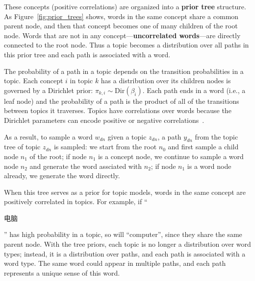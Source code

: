 These concepts (positive correlations) are organized into a {\bf prior
  tree} structure. As Figure~\ref{fig:prior_trees} shows, words in the
same concept share a common parent node, and then that concept becomes
one of many children of the root node.  Words that are not in any
concept---{\bf uncorrelated words}---are directly connected to the
root node. Thus a topic becomes a distribution over all paths in this
prior tree and each path is associated with a word.

The probability of a path in a topic depends on the transition
probabilities in a topic.  Each concept $i$ in topic $k$ has a
distribution over its children nodes is governed by a Dirichlet prior:
$\pi_{k,i} \sim \text{Dir}(\beta_{i})$.  Each path ends in a word
(i.e., a leaf node) and the probability of a path is the product of
all of the transitions between topics it traverses. Topics have
correlations over words because the Dirichlet parameters can encode
positive or negative correlations~\citep{andrzejewski-09}.

As a result, to sample a word $w_{dn}$ given a topic $z_{dn}$, a path
$y_{dn}$ from the topic tree of topic $z_{dn}$ is sampled: we start
from the root $n_0$ and first sample a child node $n_1$ of the root;
if node $n_1$ is a concept node, we continue to sample a word node
$n_2$ and generate the word assciated with $n_2$; if node $n_1$ is a
word node already, we generate the word directly.


When this tree serves as a prior for topic models, words in the same
concept are positively correlated in topics.  For example, if
``\begin{CJK*}{UTF8}{gbsn}电脑\end{CJK*}'' has high probability in a
  topic, so will ``computer'', since they share the same parent
  node. With the tree priors, each topic is no longer a distribution
  over word types; instead, it is a distribution over paths, and each
  path is associated with a word type.  The same word could appear in
  multiple paths, and each path represents a unique sense of this
  word.

